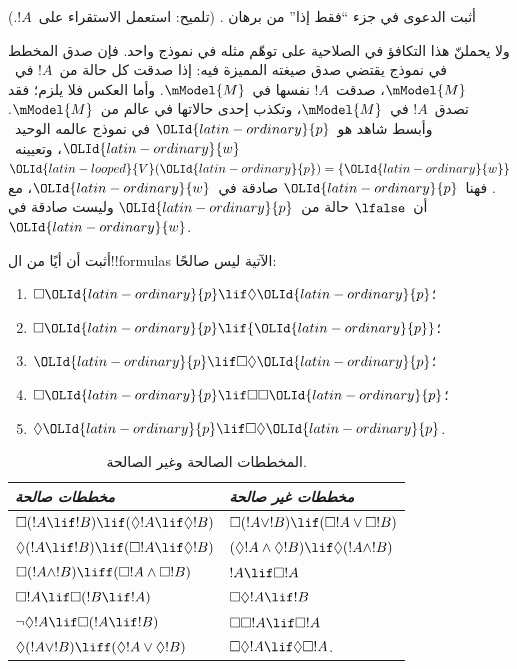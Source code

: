 \documentclass[../../../include/open-logic-section]{subfiles}
\begin{document}
\begin{prob}
  أثبت الدعوى في جزء ``فقط إذا'' من برهان
  . (تلميح: استعمل
  الاستقراء على~$!A$.)
\end{prob}

ولا يحملنّ هذا التكافؤ في الصلاحية على توهّم مثله في نموذج واحد.
فإن صدق المخطط في نموذج يقتضي صدق صيغته المميزة فيه: إذا صدقت كل
حالة من~$!A$ في~$\mModel{M}$، صدقت~$!A$ نفسها في~$\mModel{M}$.
وأما العكس فلا يلزم؛ فقد تصدق~$!A$ في~$\mModel{M}$، وتكذب
إحدى حالاتها في عالم من~$\mModel{M}$. وأبسط شاهد هو~${\OLId{latin-ordinary}{p}}$ في نموذج
عالمه الوحيد~${\OLId{latin-ordinary}{w}}$، وتعيينه~${\OLId{latin-looped}{V}}({\OLId{latin-ordinary}{p}}) = \{{\OLId{latin-ordinary}{w}}\}$. فهنا~${\OLId{latin-ordinary}{p}}$ صادقة
في~${\OLId{latin-ordinary}{w}}$، مع أن~$\lfalse$ حالة من~${\OLId{latin-ordinary}{p}}$ وليست صادقة في~${\OLId{latin-ordinary}{w}}$.

\begin{prob}
  أثبت أن أيًا من ال!!{formula}s الآتية ليس صالحًا:
  \begin{enumerate}
    \item[\Ax{D}:] \quad $\Box {\OLId{latin-ordinary}{p}} \lif \Diamond {\OLId{latin-ordinary}{p}}$؛
    \item[\Ax{T}:] \quad $\Box {\OLId{latin-ordinary}{p}} \lif {\OLId{latin-ordinary}{p}}$؛
    \item[\Ax{B}:] \quad ${\OLId{latin-ordinary}{p}} \lif \Box\Diamond {\OLId{latin-ordinary}{p}}$؛
    \item[\Ax{4}:] \quad $\Box {\OLId{latin-ordinary}{p}} \lif \Box \Box {\OLId{latin-ordinary}{p}}$؛
    \item[\Ax{5}:] \quad $\Diamond {\OLId{latin-ordinary}{p}} \lif \Box \Diamond {\OLId{latin-ordinary}{p}}$.
  \end{enumerate}
\end{prob}

\begin{table}[t]
    \centering
    \begin{tabular}{| l || l |}
      \hline
      {\emph{مخططات صالحة}} & {\emph{مخططات غير صالحة}} \\
      \hline\hline
      $\Box(!A \lif !B) \lif (\Diamond !A \lif \Diamond !B)$
      & $\Box (!A \lor !B) \lif (\Box !A \lor \Box !B)$ \\
      $\Diamond (!A \lif !B) \lif (\Box !A \lif \Diamond
      !B)$
      & $(\Diamond !A \land \Diamond !B) \lif \Diamond (!A
      \land !B)$\\
      $\Box (!A \land !B) \liff (\Box !A \land \Box !B)$
      & $!A \lif \Box !A$ \\
      $\Box !A \lif \Box (!B \lif !A)$
      & $\Box \Diamond !A \lif !B$ \\
      $\lnot \Diamond !A \lif \Box (!A \lif !B)$
      & $\Box \Box !A \lif \Box !A$ \\
      $\Diamond (!A \lor !B) \liff (\Diamond !A \lor
      \Diamond !B)$
      & $\Box \Diamond !A \lif \Diamond \Box !A$. \\
      \hline
    \end{tabular}
    \caption{المخططات الصالحة وغير الصالحة.}
\end{table}
\end{document}
